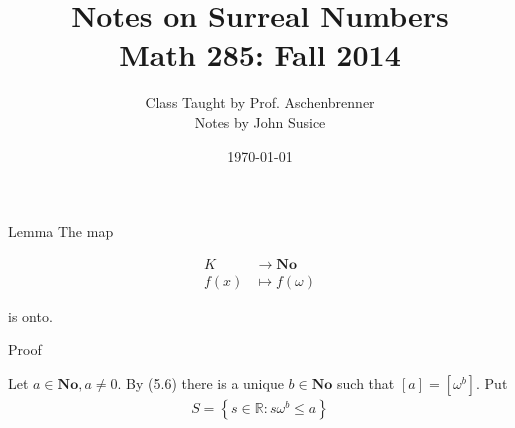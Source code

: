 \documentclass{article}
\title{Notes on Surreal Numbers \\ Math 285: Fall 2014}
\author{Class Taught by Prof. Aschenbrenner \\ Notes by John Susice}
\date{\today}
\newcommand{\R}{\mathbb{R}}
\newcommand{\No}{\mathbf{No}}
\newcommand{\brac}[1]{\left[ #1 \right]}
\newcommand{\curly}[1]{\left\{ #1 \right\}}
\newcommand{\arr}{\rightarrow}
\newcommand{\w}{\omega}
\begin{document}
\maketitle{}

Lemma The map

\begin{align*}
	K &\arr \No \\
	f(x) &\mapsto f(\w)
\end{align*}

is onto.

Proof

Let $a \in \No, a \neq 0$. By (5.6) there is a unique $b \in \No$ such that $\brac{a} = \brac{\w^b}$.
Put
\begin{align*}
	S = \curly{s \in \R \colon s\w^b \leq a}
\end{align*}
\end{document}
